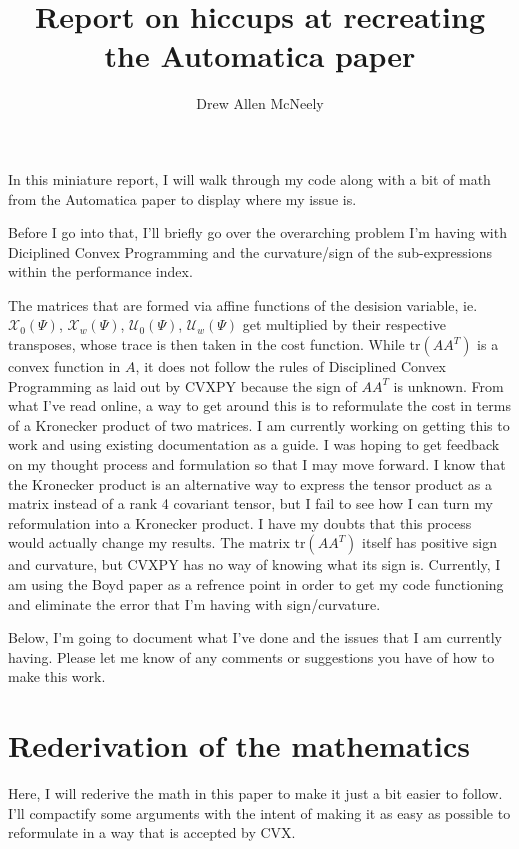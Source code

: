 \documentclass[]{article}
\title{Report on hiccups at recreating the Automatica paper}
\author{Drew Allen McNeely}
\begin{document}
\maketitle

In this miniature report, I will walk through my code along with a bit
of math from the Automatica paper to display where my issue is.

Before I go into that, I'll briefly go over the overarching problem I'm
having with Diciplined Convex Programming and the curvature/sign of the
sub-expressions within the performance index.

The matrices that are formed via affine functions of the desision
variable, ie. \(\mathcal{X}_0(\Psi)\), \(\mathcal{X}_w(\Psi)\),
\(\mathcal{U}_0(\Psi)\), \(\mathcal{U}_w(\Psi)\) get multiplied by their
respective transposes, whose trace is then taken in the cost function.
While \(\mathrm{tr}(AA^T)\) is a convex function in \(A\), it does not
follow the rules of Disciplined Convex Programming as laid out by CVXPY
because the sign of \(AA^T\) is unknown. From what I've read online, a
way to get around this is to reformulate the cost in terms of a
Kronecker product of two matrices. I am currently working on getting
this to work and using existing documentation as a guide. I was hoping
to get feedback on my thought process and formulation so that I may move
forward. I know that the Kronecker product is an alternative way to
express the tensor product as a matrix instead of a rank 4 covariant
tensor, but I fail to see how I can turn my reformulation into a
Kronecker product. I have my doubts that this process would actually
change my results. The matrix \(\mathrm{tr}(AA^T)\) itself has positive
sign and curvature, but CVXPY has no way of knowing what its sign is.
Currently, I am using the Boyd paper as a refrence point in order to get
my code functioning and eliminate the error that I'm having with
sign/curvature.

Below, I'm going to document what I've done and the issues that I am
currently having. Please let me know of any comments or suggestions you
have of how to make this work.

\section{Rederivation of the mathematics}

Here, I will rederive the math in this paper to make it just a bit easier to follow.
I'll compactify some arguments with the intent of making it as easy as possible to reformulate in a way that is accepted by CVX.
\end{document}
